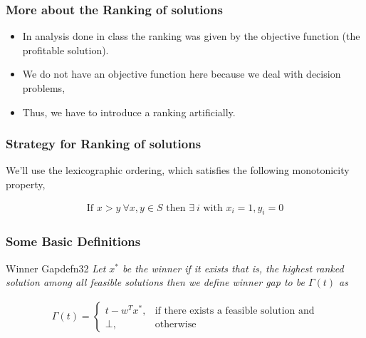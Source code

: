 \begin{frame}
    \frametitle{More about the Ranking of solutions}

    \begin{itemize}
        \item In analysis done in class the ranking was given by the objective function (the
              profitable solution).
        \item We do not have an objective function here because we deal with decision
              problems,
        \item Thus, we have to introduce a ranking artificially.
    \end{itemize}

\end{frame}

\begin{frame}
    \frametitle{Strategy for Ranking of solutions}

    We'll use the lexicographic ordering, which satisfies the following
    monotonicity property,

    \begin{align*}
        \text{If } x > y \: \forall x, y \in S \text{ then } \exists \: i \text{ with } x_i = 1, y_i = 0
    \end{align*}

\end{frame}

\begin{frame}
    \frametitle{Some Basic Definitions}

    \begin{define}{Winner Gap}{defn32}
        \textit{Let $x^{*}$ be the winner if it exists that is, the highest ranked solution among all feasible solutions
            then we define winner gap to be $\Gamma(t)$ as}

        \begin{align*}
            \Gamma(t) =
            \begin{cases}
                t - w^T x^{*}, & \text{if there exists a feasible solution and} \\
                \bot,          & \text{otherwise}
            \end{cases}
        \end{align*}
    \end{define}

\end{frame}

